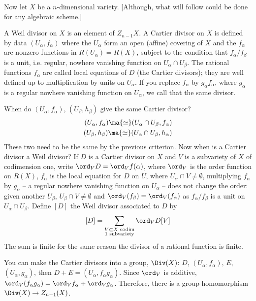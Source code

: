 Now let $X$ be a $n$-dimensional variety. [Although, what will follow could be done for any algebraic scheme.] 

\begin{dfn}
A Weil divisor on $X$ is an element of $Z_{n-1} X$. A Cartier divisor on $X$ is defined by data $(U_\alpha,f_\alpha)$ where the $U_\alpha$ form an open (affine) covering of $X$ and the $f_\alpha$ are nonzero functions in $R(U_\alpha)=R(X)$, subject to the condition that $f_\alpha/f_\beta$ is a unit, i.e. regular, nowhere vanishing function on $U_\alpha \cap U_\beta$. The rational functions $f_\alpha$ are called local equations of $D$ (the Cartier divisors); they are well defined up to multiplication by units on $U_\alpha$. If you replace $f_\alpha$ by $g_\alpha f_\alpha$, where $g_\alpha$ is a regular nowhere vanishing function on $U_\alpha$, we call that the same divisor. 
\end{dfn}


When do $(U_\alpha,f_\alpha)$, $(U_\beta,h_\beta)$ give the same Cartier divisor? 
	\[
	\begin{split}
	(U_\alpha, f_\alpha) \ma{\simeq} (U_\alpha \cap U_\beta, f_\alpha) \\
	(U_\beta, h_\beta) \ma{\simeq} (U_\alpha \cap U_\beta, h_\alpha) 
	\end{split}
	\]
These two need to be the same by the previous criterion. Now when is a Cartier divisor a Weil divisor? If $D$ is a Cartier divisor on $X$ and $V$ is a subvariety of $X$ of codimension one, write $\ord_V D= \ord_V f(\alpha)$, where $\ord_V$ is the order function on $R(X)$, $f_\alpha$ is the local equation for $D$ on $U$, where $U_\alpha \cap V \neq \emptyset$, multiplying $f_\alpha$ by $g_\alpha$ -- a regular nowhere vanishing function on $U_\alpha$ -- does not change the order: given another $U_\beta$, $U_\beta \cap V \neq \emptyset$ and $\ord_V(f_\beta)=\ord_V(f_\alpha)$ as $f_\alpha/f_\beta$ is a unit on $U_\alpha \cap U_\beta$. Define $[D]$ the Weil divisor associated to $D$ by 
	\[
	[D]=\sum_{\substack{V \subset X \text{ codim}\\ \text{1 subvariety}}} \ord_V D[V]
	\]
The sum is finite for the same reason the divisor of a rational function is finite. 


You can make the Cartier divisors into a group, $\Div(X)$: $D$, $(U_\alpha,f_\alpha)$, $E$, $(U_\alpha,g_\alpha)$, then $D+E=(U_\alpha,f_\alpha g_\alpha)$. Since $\ord_V$ is additive, $\ord_V(f_\alpha g_\alpha)= \ord_V f_\alpha + \ord_V g_\alpha$. Therefore, there is a group homomorphism $\Div(X) \to Z_{n-1}(X)$.



